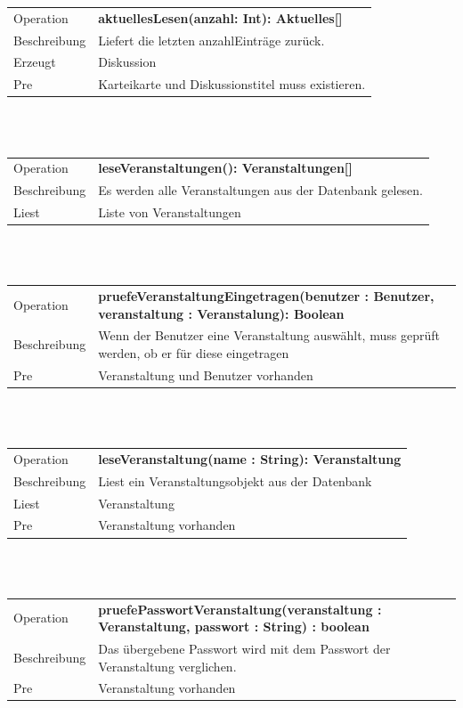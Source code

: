 \documentclass[12pt,a4paper]{article}
\begin{document}
{\begin{tabular}{|l|p{12cm}|}
	\hline
	Operation & \textbf{ aktuellesLesen(anzahl: Int): Aktuelles[]} \\ 
	Beschreibung & Liefert die letzten \glqq anzahl\grqq Einträge zurück.\\ 
	Erzeugt & Diskussion \\ 
	Pre & Karteikarte und Diskussionstitel muss existieren. \\ 
	\hline 
\end{tabular} \\\\

\begin{tabular}{|l|p{12cm}|}
	\hline
	Operation &  \textbf{leseVeranstaltungen(): Veranstaltungen[] }\\ 
	Beschreibung &  Es werden alle Veranstaltungen aus der Datenbank gelesen.\\ 
	Liest &  Liste von Veranstaltungen\\ 
	\hline 
\end{tabular}\\\\

\begin{tabular}{|l|p{12cm}|}
	\hline
	Operation &  \textbf{pruefeVeranstaltungEingetragen(benutzer : Benutzer, veranstaltung : Veranstalung): Boolean} \\ 
	Beschreibung &  Wenn der Benutzer eine Veranstaltung auswählt, muss geprüft werden, ob er für diese eingetragen\\ 
	Pre &  Veranstaltung und Benutzer vorhanden\\ 
	\hline 
\end{tabular}\\\\

\begin{tabular}{|l|p{12cm}|}
	\hline
	Operation &  \textbf{leseVeranstaltung(name : String): Veranstaltung} \\ 
	Beschreibung &  Liest ein Veranstaltungsobjekt aus der Datenbank\\ 
	Liest &  Veranstaltung\\ 
	Pre &  Veranstaltung vorhanden\\ 
	\hline 
\end{tabular}\\\\

\begin{tabular}{|l|p{12cm}|}
	\hline
	Operation &  \textbf{pruefePasswortVeranstaltung(veranstaltung : Veranstaltung, passwort : String) : boolean} \\ 
	Beschreibung &  Das übergebene Passwort wird mit dem Passwort der Veranstaltung verglichen.\\ 
	Pre & Veranstaltung vorhanden \\ 
	\hline 
\end{tabular}\\\\

}
\end{document}
